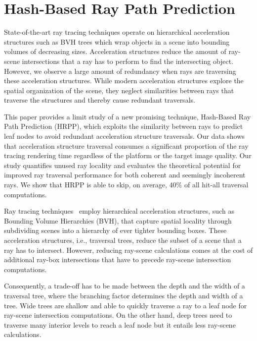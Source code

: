 
\chapter{Hash-Based Ray Path Prediction}
\label{ch:hrpp}

State-of-the-art ray tracing techniques operate on hierarchical acceleration structures such as BVH trees which wrap objects in a scene into bounding volumes of decreasing sizes. Acceleration structures reduce the amount of ray-scene intersections that a ray has to perform to find the intersecting object. However, we observe a large amount of redundancy when rays are traversing these acceleration structures. While modern acceleration structures explore the spatial organization of the scene, they neglect similarities between rays that traverse the structures and thereby cause redundant traversals.

This paper provides a limit study of a new promising technique, Hash-Based Ray Path Prediction (HRPP), which exploits the similarity between rays to predict leaf nodes to avoid redundant acceleration structure traversals. Our data shows that acceleration structure traversal consumes a significant proportion of the ray tracing rendering time regardless of the platform or the target image quality. Our study quantifies unused ray locality and evaluates the theoretical potential for improved ray traversal performance for both coherent and seemingly incoherent rays. We show that HRPP is able to skip, on average, 40\% of all hit-all traversal computations.

Ray tracing techniques~\cite{Whitted:1980:IIM:358876.358882} employ hierarchical acceleration structures, such as Bounding Volume Hierarchies (BVH), that capture spatial locality through subdividing scenes into a hierarchy of ever tighter bounding boxes. These acceleration structures, i.e., traversal trees, reduce the subset of a scene that a ray has to intersect. However, reducing ray-scene calculations comes at the cost of additional ray-box intersections that have to precede ray-scene intersection computations. 

Consequently, a trade-off has to be made between the depth and the width of a traversal tree, where the branching factor determines the depth and width of a tree. Wide trees are shallow and able to quickly traverse a ray to a leaf node for ray-scene intersection computations. On the other hand, deep trees need to traverse many interior levels to reach a leaf node but it entails less ray-scene calculations.

